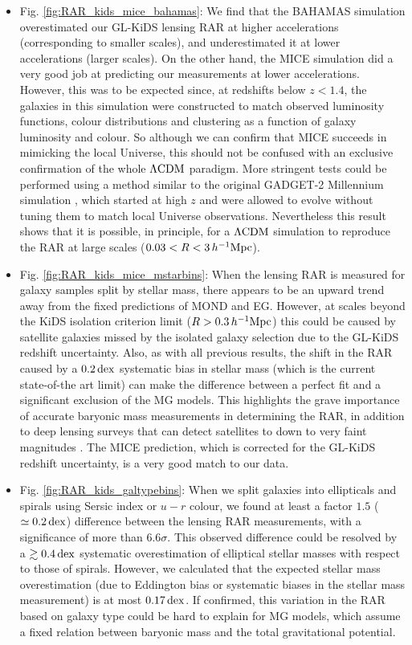 \documentclass[usenatbib]{mnras}
\newcommand{\hMpc}{\, h^{-1}{\rm{Mpc}} }
\newcommand{\lcdm}{{\rm \Lambda CDM}}
\newcommand{\dex}{\, {\rm dex}}
\begin{document}
\begin{itemize}
	\item Fig. \ref{fig:RAR_kids_mice_bahamas}: We find that the BAHAMAS simulation overestimated our GL-KiDS lensing RAR at higher accelerations (corresponding to smaller scales), and underestimated it at lower accelerations (larger scales). On the other hand, the MICE simulation did a very good job at predicting our measurements at lower accelerations. However, this was to be expected since, at redshifts below $z<1.4$, the galaxies in this simulation were constructed to match observed luminosity functions, colour distributions and clustering as a function of galaxy luminosity and colour. So although we can confirm that MICE succeeds in mimicking the local Universe, this should not be confused with an exclusive confirmation of the whole $\lcdm$ paradigm. More stringent tests could be performed using a method similar to the original {\scshape GADGET-2} Millennium simulation \cite[]{springel2001,springel2005}, which started at high $z$ and were allowed to evolve without tuning them to match local Universe observations. Nevertheless this result shows that it is possible, in principle, for a $\lcdm$ simulation to reproduce the RAR at large scales ($0.03 < R < 3 \hMpc$).
	
	\item Fig. \ref{fig:RAR_kids_mice_mstarbins}: When the lensing RAR is measured for galaxy samples split by stellar mass, there appears to be an upward trend away from the fixed predictions of MOND and EG. However, at scales beyond the KiDS isolation criterion limit ($R>0.3 \hMpc$) this could be caused by satellite galaxies missed by the isolated galaxy selection due to the GL-KiDS redshift uncertainty. Also, as with all previous results, the shift in the RAR caused by a $0.2 \dex$ systematic bias in stellar mass (which is the current state-of-the art limit) can make the difference between a perfect fit and a significant exclusion of the MG models. This highlights the grave importance of accurate baryonic mass measurements in determining the RAR, in addition to deep lensing surveys that can detect satellites to down to very faint magnitudes \cite[such as the future Euclid survey;][]{laureijs2011}. The MICE prediction, which is corrected for the GL-KiDS redshift uncertainty, is a very good match to our data.
	
	\item Fig. \ref{fig:RAR_kids_galtypebins}: When we split galaxies into ellipticals and spirals using Sersic index or $u-r$ colour, we found at least a factor $1.5$ ($\simeq0.2 \dex$) difference between the lensing RAR measurements, with a significance of more than $6.6 \sigma$. This observed difference could be resolved by a $\gtrsim 0.4 \dex$ systematic overestimation of elliptical stellar masses with respect to those of spirals. However, we calculated that the expected stellar mass overestimation (due to Eddington bias or systematic biases in the stellar mass measurement) is at most $0.17 \dex$. If confirmed, this variation in the RAR based on galaxy type could be hard to explain for MG models, which assume a fixed relation between baryonic mass and the total gravitational potential.
	

\end{itemize}
\end{document}

